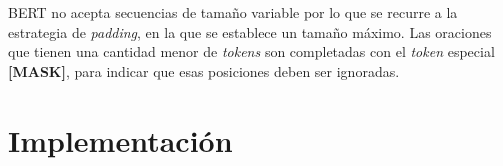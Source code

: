 BERT no acepta secuencias de tamaño variable por lo que se recurre a la estrategia de \textit{padding}, en la que se establece un tamaño máximo. Las oraciones que tienen una cantidad menor de \textit{tokens} son completadas con el \textit{token} especial \textbf{[MASK]}, para indicar que esas posiciones deben ser ignoradas.

\section{Implementación}




